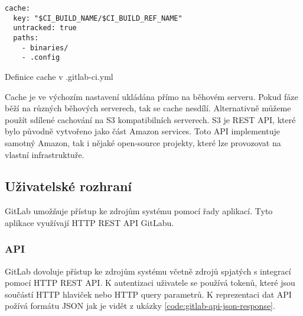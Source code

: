 \begin{listing}[ht]
\begin{verbatim}
cache:
  key: "$CI_BUILD_NAME/$CI_BUILD_REF_NAME"
  untracked: true
  paths:
    - binaries/
    - .config
\end{verbatim}
\caption{Definice cache v .gitlab-ci.yml}
\end{listing}


Cache je ve výchozím nastavení ukládána přímo na běhovém serveru.
Pokud fáze běží na různých běhových serverech, tak se cache nesdílí.
Alternativně můžeme použít sdílené cachování na S3 kompatibilních serverech.
S3 je REST API, které bylo původně vytvořeno jako část Amazon services.
Toto API implementuje samotný Amazon, tak i nějaké open-source projekty, které lze provozovat na vlastní infrastruktuře.


\subsection{Uživatelské rozhraní}

GitLab umožňuje přístup ke zdrojům systému pomocí řady aplikací.
Tyto aplikace využívají HTTP REST API GitLabu. 

\subsubsection{API}

GitLab dovoluje přístup ke zdrojům systému včetně zdrojů spjatých s integrací pomocí HTTP REST API.
K autentizaci uživatele se používá tokenů, které jsou součástí HTTP hlaviček nebo HTTP query parametrů.
K reprezentaci dat API požívá formátu JSON jak je vidět z ukázky \ref{code:gitlab-api-json-response}.

